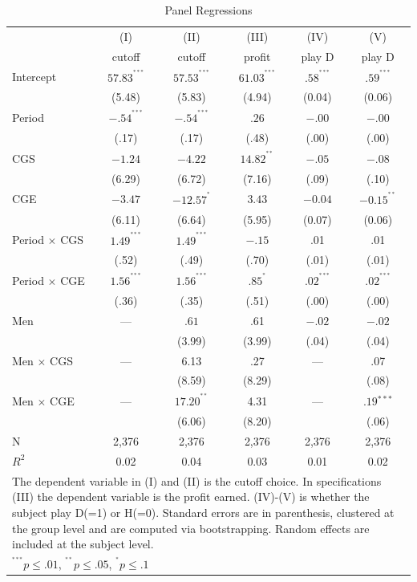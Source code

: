 \documentclass[11pt, letterpaper]{article}
\theoremstyle{plain}
\begin{document}
\begin{table}[ht]
\centering
\caption{Panel Regressions}
\footnotesize
\begin{tabular}{lccccc}

  & (I) & (II) & (III)  & (IV) & (V)\\
&  cutoff & cutoff  & profit & play D & play D \\
    \hline
Intercept & $57.83^{^{***}}$ &  $ 57.53^{^{***}}$ &  $61.03^{^{***}}$ & $.58^{^{***}}$& $.59^{^{***}}$\\
& (5.48) & (5.83)  & (4.94) & (0.04) & (0.06)\\
Period & $-.54^{^{***}}$ & $-.54^{^{***}}$  & $.26$ &  $ -.00$ & $ -.00$\\
& (.17)&  (.17) & (.48) & (.00) & (.00) \\
CGS & $-1.24$ &  $-4.22$  &  $14.82^{^{**}}$ &  $-.05$ & $-.08$\\
& (6.29) & (6.72) & (7.16) & (.09) & (.10)\\
CGE & $-3.47$ &  $-12.57^{^{*}}$   &  $3.43$ &  $-0.04$ & $-0.15^{^{**}}$\\
& (6.11) & (6.64)  & (5.95) & (0.07) & (0.06)\\
Period $\times$ CGS & $1.49^{^{***}}$& $ 1.49^{^{***}}$ & $-.15$ & .01 & .01 \\
& (.52) & (.49) & (.70) & (.01) & (.01) \\
Period $\times$ CGE & $1.56^{^{***}}$& $1.56^{^{***}}$ &$.85^{^{*}}$ & $.02^{^{***}}$ & $.02^{^{***}}$ \\
& (.36) & (.35)  & (.51) & (.00) &  (.00)\\
Men & --- &  $.61$ & .61  & $-.02$ &  $-.02$ \\
&  & (3.99) & (3.99)  & (.04) & (.04)\\
Men $\times$ CGS & ---&  6.13 &  .27 & --- & .07\\
& & (8.59) & (8.29)&  & (.08)\\
Men $\times$ CGE & ---& $17.20^{^{**}}$ & 4.31 & --- & $.19{^{***}}$\\
& & (6.06)& (8.20)&& (.06)\\

\hline
N & 2,376 & 2,376 & 2,376 & 2,376  & 2,376  \\ 
$R^2$ & 0.02 & 0.04  & 0.03 & 0.01 & 0.02\\
\hline
\hline
 \multicolumn{6}{p{.65\textwidth}}{\scriptsize{The dependent variable in (I) and (II) is the cutoff choice. In specifications (III) the dependent variable is the profit earned. (IV)-(V) is whether the subject play D(=1) or H(=0). Standard errors are in parenthesis, clustered at the group level and are computed via bootstrapping. Random effects are included at the subject level. }}\\ 
 \multicolumn{4}{p{0.4\textwidth}}{\scriptsize{ $^{^{***}}p\leq.01$,
    $^{^{**}}p\leq.05$, $^{^{*}}p\leq.1$}} \\
\end{tabular}
\label{table:ols_all}
\end{table}
\end{document}
